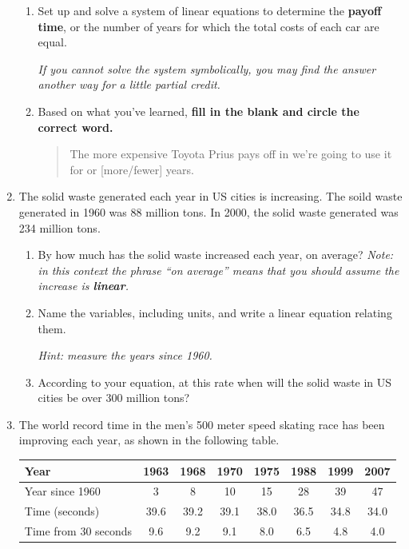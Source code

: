 \documentclass[12pt]{article}
\begin{document}
\begin{enumerate}
\begin{enumerate}
\item Set up and solve a system of linear equations to determine the \textbf{payoff time}, or the number of years for which the total costs of each car are equal.

\emph{If you cannot solve the system symbolically, you may find the answer another way for a little partial credit.}
\vfill

\item Based on what you've learned, \textbf{fill in the blank and circle the correct word.}

\begin{quote}
The more expensive Toyota Prius pays off in we're going to use it for \hrulefill   or [more/fewer] years.  
\end{quote}

\end{enumerate}
\newpage



\item The solid waste generated each year in US cities is increasing.  The soild waste generated in 1960 was 88 million tons. In 2000, the solid waste generated was 234 million tons.  

\begin{enumerate}
\item By how much has the solid waste increased each year, on average?  \emph{Note:  in this context the phrase ``on average'' means that you should assume the increase is \textbf{linear}.}
\vfill
\item Name the variables, including units, and write a linear equation relating them.

\emph{Hint:  measure the years since 1960.}
\vfill
\item According to your equation, at this rate when will the solid waste in US cities be over 300 million tons?
\vfill
\end{enumerate}
\newpage %

\item The world record time in the men's 500 meter speed skating race has been improving each year, as shown in the following table.

\begin{center}
\begin{tabular} {|l|c|c |c|c|c|c|c|}  \hline
Year & 1963 & 1968 & 1970 & 1975 & 1988 & 1999 & 2007  \\ \hline
Year since 1960 & 3 & 8 & 10 & 15 & 28 & 39 & 47  \\ \hline
Time (seconds) & 39.6 & 39.2 & 39.1 & 38.0 & 36.5 & 34.8 & 34.0  \\ \hline
Time from 30 seconds & 9.6 & 9.2 & 9.1 & 8.0 & 6.5 & 4.8 & 4.0  \\ \hline
\end{tabular}
\end{center}


\end{enumerate}
\end{document}
